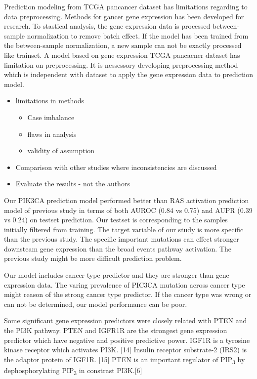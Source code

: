 \documentclass[10pt,letterpaper]{article}
\providecommand{\tightlist}{%
  \setlength{\itemsep}{0pt}\setlength{\parskip}{0pt}}
\begin{document}
Prediction modeling from TCGA pancancer dataset has limitations
regarding to data preprocessing. Methods for gancer gene expression has
been developed for research. To stastical analysis, the gene expression
data is processed between-sample normalization to remove batch effect.
If the model has been trained from the between-sample normalization, a
new sample can not be exactly processed like trainset. A model based on
gene expression TCGA pancacner dataset has limitation on preprocessing.
It is nessessory developing preprocessing method which is independent
with dataset to apply the gene expression data to prediction model.

\begin{itemize}
\item
  limitations in methods

  \begin{itemize}
  \tightlist
  \item
    Case imbalance\\
  \item
    flaws in analysis\\
  \item
    validity of assumption
  \end{itemize}
\item
  Comparison with other studies where inconsistencies are discussed\\
\item
  Evaluate the results - not the authors
\end{itemize}

Our PIK3CA prediction model performed better than RAS activation
prediction model of previous study in terms of both AUROC (0.84 vs 0.75)
and AUPR (0.39 vs 0.24) on testset prediction. Our testset is
corresponding to the samples initially filtered from training. The
target variable of our study is more specific than the previous study.
The specific important mutations can effect stronger downsteam gene
expression than the broad events pathway activation. The previous study
might be more difficult prediction problem.

Our model includes cancer type predictor and they are stronger than gene
expression data. The varing prevalence of PIC3CA mutation across cancer
type might reason of the strong cancer type predictor. If the cancer
type was wrong or can not be determined, our model performance can be
poor.

Some significant gene expression predictors were closely related with
PTEN and the PI3K pathway. PTEN and IGFR1R are the strongest gene
expression predictor which have negative and positive predictive power.
IGF1R is a tyrosine kinase receptor which activates PI3K. {[}14{]}
Insulin receptor substrate-2 (IRS2) is the adaptor protein of IGF1R.
{[}15{]} PTEN is an important regulator of PIP\textsubscript{3} by
dephosphorylating PIP\textsubscript{3} in constrast PI3K.{[}6{]}
\end{document}
